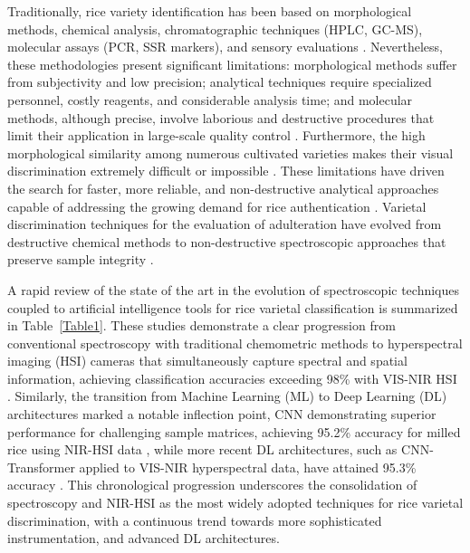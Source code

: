 \documentclass[final,5p,times,twocolumn]{elsarticle}
\begin{document}
Traditionally, rice variety identification has been based on morphological methods, chemical analysis, chromatographic techniques (HPLC, GC-MS), molecular assays (PCR, SSR markers), and sensory evaluations \cite{Shi2025, Sampaio2019, Giang2020b}. 
Nevertheless, these methodologies present significant limitations: morphological methods suffer from subjectivity and low precision; analytical techniques require specialized personnel, costly reagents, and considerable analysis time; and molecular methods, although precise, involve laborious and destructive procedures that limit their application in large-scale quality control \cite{Rahmani2022, Giang2020b}. 
Furthermore, the high morphological similarity among numerous cultivated varieties makes their visual discrimination extremely difficult or impossible \cite{Onmarkhong2022, Tong2021, Shi2022}. 
These limitations have driven the search for faster, more reliable, and non-destructive analytical approaches capable of addressing the growing demand for rice authentication \cite{Shi2025, Dehbasteh2025, Cazzaniga2026}. 
Varietal discrimination techniques for the evaluation of adulteration have evolved from destructive chemical methods to non-destructive spectroscopic approaches that preserve sample integrity \cite{Weng2020, Kang2024, Zhao2024}.


A rapid review of the state of the art in the evolution of spectroscopic techniques coupled to artificial intelligence tools for rice varietal classification is summarized in Table~\ref{Table1}. 
These studies demonstrate a clear progression from conventional spectroscopy with traditional chemometric methods \cite{Shi2022, Tong2021} to hyperspectral imaging (HSI) cameras that simultaneously capture spectral and spatial information, achieving classification accuracies exceeding 98\% with VIS-NIR HSI \cite{Weng2020}. 
Similarly, the transition from Machine Learning (ML) to Deep Learning (DL) architectures marked a notable inflection point, CNN demonstrating superior performance for challenging sample matrices, achieving 95.2\% accuracy for milled rice using NIR-HSI data \cite{Onmarkhong2022}, while more recent DL architectures, such as CNN-Transformer applied to VIS-NIR hyperspectral data, have attained 95.3\% accuracy \cite{Zhang2025}. 
This chronological progression underscores the consolidation of spectroscopy and NIR-HSI as the most widely adopted techniques for rice varietal discrimination, with a continuous trend towards more sophisticated instrumentation, and advanced DL architectures.
\end{document}
